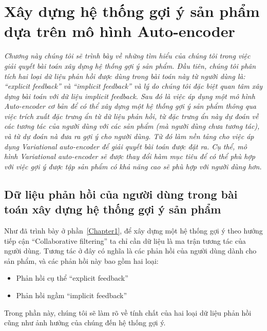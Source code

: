 \chapter{Xây dựng hệ thống gợi ý sản phẩm dựa trên mô hình Auto-encoder}
\graphicspath{{Chapter3/Chapter3Figs}}
\label{Chapter3}

\textit{Chương này chúng tôi sẽ trình bày về những tìm hiểu của chúng tôi trong việc giải quyết bài toán xây dựng hệ thống gợi ý sản phẩm. 
Đầu tiên, chúng tôi phân tích hai loại dữ liệu phản hồi được dùng trong bài toán này từ người dùng là:
``explicit feedback'' và ``implicit feedback'' và lý do chúng tôi đặc biệt quan tâm xây dựng bài toán với dữ liệu implicit feedback.
Sau đó là việc áp dụng một mô hình Auto-encoder cơ bản để có thể xây dựng một hệ thống gợi ý sản phẩm thông qua việc trích xuất đặc trưng ẩn từ dữ liệu phản hồi, từ đặc trưng ẩn này dự đoán về các tương tác của người dùng với các sản phẩm (mà người dùng chưa tương tác), và từ dự đoán nà đưa ra gợi ý cho người dùng.
Từ đó làm nền tảng cho việc áp dụng Variational auto-encoder để giải quyết bài toán được đặt ra. 
Cụ thể, mô hình Variational auto-encoder sẽ được thay đổi hàm mục tiêu để có thể phù hợp với việc gợi ý được tập sản phẩm có khả năng cao sẽ phù hợp với người dùng hơn.}


\section{Dữ liệu phản hồi của người dùng trong bài toán xây dựng hệ thống gợi ý sản phẩm}
    Như đã trình bày ở phần~\ref{Chapter1}, để xây dựng một hệ thống gợi ý 
    theo hướng tiếp cận ``Collaborative filtering'' ta chỉ cần dữ liệu là ma trận tương tác của người dùng.
    Tương tác ở đây có nghĩa là các phản hồi của người dùng dành cho sản phẩm, và các phản hồi này bao gồm hai loại:
    \begin{itemize}
        \item Phản hồi cụ thể ``explicit feedback''
        \item Phản hồi ngầm ``implicit feedback''
    \end{itemize}
    Trong phần này, chúng tôi sẽ làm rõ về tính chất của hai loại dữ liệu phản hồi cũng như ảnh hưởng của chúng đến hệ thống gợi ý.
